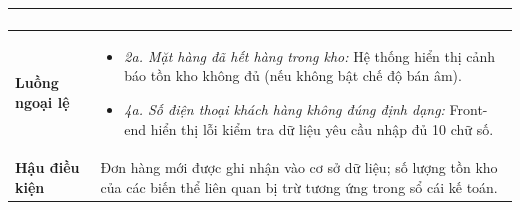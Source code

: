 \begin{table}[htbp]
\begin{tabularx}{\textwidth}{|l|X|}
\begin{enumerate}[leftmargin=*, nosep]
\end{enumerate} \\ \hline
\textbf{Luồng ngoại lệ} & 
\begin{itemize}[leftmargin=*, nosep]
    \item \textit{2a. Mặt hàng đã hết hàng trong kho:} Hệ thống hiển thị cảnh báo tồn kho không đủ (nếu không bật chế độ bán âm).
    \item \textit{4a. Số điện thoại khách hàng không đúng định dạng:} Front-end hiển thị lỗi kiểm tra dữ liệu yêu cầu nhập đủ 10 chữ số.
\end{itemize} \\ \hline
\textbf{Hậu điều kiện} & Đơn hàng mới được ghi nhận vào cơ sở dữ liệu; số lượng tồn kho của các biến thể liên quan bị trừ tương ứng trong sổ cái kế toán. \\ \hline
\end{tabularx}
\end{table}

